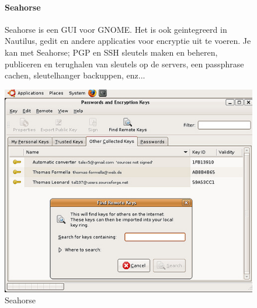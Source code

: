 \documentclass[12pt]{article}
\begin{document}
				\begin{figure}[!ht]
					\paragraph{Seahorse}
						Seahorse is een GUI voor GNOME. Het is ook geintegreerd in Nautilus, gedit 								en andere applicaties voor encryptie uit te voeren.
						Je kan met Seahorse; PGP en SSH sleutels maken en beheren, publiceren en 								terughalen van sleutels op de servers, een passphrase cachen, 											sleutelhanger backuppen, enz...
					\begin{center}
						\includegraphics[scale=0.5]{Pictures/Seahorse}
					\end{center}
					\caption{Seahorse}
				\end{figure}	
\end{document}
